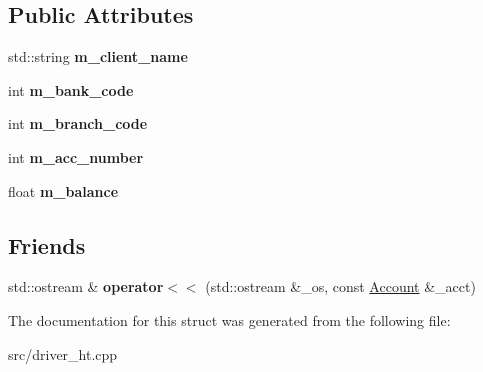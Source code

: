 \subsection*{Public Attributes}
\begin{DoxyCompactItemize}
\item 
std\+::string {\bfseries m\+\_\+client\+\_\+name}\hypertarget{structAccount_ad5cb7fe0416e3df9e0d88216a26cfd93}{}\label{structAccount_ad5cb7fe0416e3df9e0d88216a26cfd93}

\item 
int {\bfseries m\+\_\+bank\+\_\+code}\hypertarget{structAccount_a37b2a7fc3c051b25a40a165239917afb}{}\label{structAccount_a37b2a7fc3c051b25a40a165239917afb}

\item 
int {\bfseries m\+\_\+branch\+\_\+code}\hypertarget{structAccount_a52908ea7db7c7d77c264311bb7a63db2}{}\label{structAccount_a52908ea7db7c7d77c264311bb7a63db2}

\item 
int {\bfseries m\+\_\+acc\+\_\+number}\hypertarget{structAccount_a1f8ea4153ebb46f30e83cdc7bf55eda7}{}\label{structAccount_a1f8ea4153ebb46f30e83cdc7bf55eda7}

\item 
float {\bfseries m\+\_\+balance}\hypertarget{structAccount_ac3210bf07613a2eb83410b4f09807e68}{}\label{structAccount_ac3210bf07613a2eb83410b4f09807e68}

\end{DoxyCompactItemize}
\subsection*{Friends}
\begin{DoxyCompactItemize}
\item 
std\+::ostream \& {\bfseries operator$<$$<$} (std\+::ostream \&\+\_\+os, const \hyperlink{structAccount}{Account} \&\+\_\+acct)\hypertarget{structAccount_a417160cc74cd4e58a557eeced84f03b1}{}\label{structAccount_a417160cc74cd4e58a557eeced84f03b1}

\end{DoxyCompactItemize}


The documentation for this struct was generated from the following file\+:\begin{DoxyCompactItemize}
\item 
src/driver\+\_\+ht.\+cpp\end{DoxyCompactItemize}
